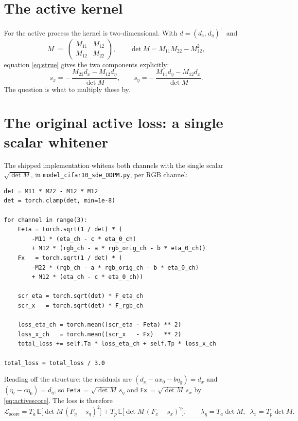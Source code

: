 \documentclass[11pt]{article}
\newcommand{\Tp}{T_p}
\newcommand{\Ta}{T_a}
\begin{document}
\section{The active kernel}

For the active process the kernel is two-dimensional. With $d=(d_x,d_\eta)^{\!\top}$ and
\begin{equation}
M \;=\; \begin{pmatrix} M_{11} & M_{12}\\ M_{12} & M_{22}\end{pmatrix},
\qquad \det M = M_{11}M_{22}-M_{12}^{2},
\end{equation}
equation \eqref{eq:strue} gives the two components explicitly:
\begin{equation}
s_x = -\,\frac{M_{22}d_x - M_{12}d_\eta}{\det M},
\qquad
s_\eta = -\,\frac{M_{11}d_\eta - M_{12}d_x}{\det M}.
\label{eq:activescore}
\end{equation}
The question is what to multiply these by.

\section{The original active loss: a single scalar whitener}

\begin{sloppypar}
The shipped implementation whitens both channels with the single scalar
$\sqrt{\det M}$, in \texttt{model\_cifar10\_sde\_DDPM.py}, per RGB channel:
\end{sloppypar}

\begin{verbatim}
det = M11 * M22 - M12 * M12
det = torch.clamp(det, min=1e-8)

for channel in range(3):
    Feta = torch.sqrt(1 / det) * (
        -M11 * (eta_ch - c * eta_0_ch)
        + M12 * (rgb_ch - a * rgb_orig_ch - b * eta_0_ch))
    Fx   = torch.sqrt(1 / det) * (
        -M22 * (rgb_ch - a * rgb_orig_ch - b * eta_0_ch)
        + M12 * (eta_ch - c * eta_0_ch))

    scr_eta = torch.sqrt(det) * F_eta_ch
    scr_x   = torch.sqrt(det) * F_rgb_ch

    loss_eta_ch = torch.mean((scr_eta - Feta) ** 2)
    loss_x_ch   = torch.mean((scr_x   - Fx)   ** 2)
    total_loss += self.Ta * loss_eta_ch + self.Tp * loss_x_ch

total_loss = total_loss / 3.0
\end{verbatim}

\noindent
Reading off the structure: the residuals are $(d_x - a x_0 - b\eta_0)=d_x$ and
$(\eta_t - c\eta_0)=d_\eta$, so \texttt{Feta}$\,=\sqrt{\det M}\,s_\eta$ and
\texttt{Fx}$\,=\sqrt{\det M}\,s_x$ by \eqref{eq:activescore}. The loss is therefore
\begin{equation}
\mathcal{L}_{\text{score}}
= \Ta\,\mathbb{E}\big[\det M\,(F_\eta - s_\eta)^{2}\big]
+ \Tp\,\mathbb{E}\big[\det M\,(F_x - s_x)^{2}\big],
\qquad \lambda_\eta=\Ta\det M,\;\; \lambda_x=\Tp\det M .
\label{eq:Lscore}
\end{equation}
\end{document}
